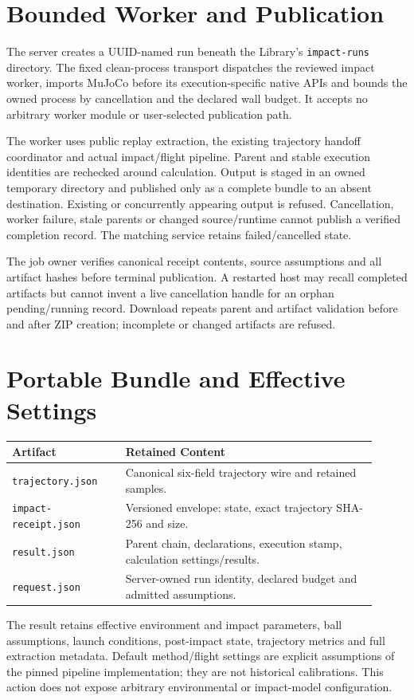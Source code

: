 \documentclass[11pt]{article}
\newcommand{\code}[1]{\nolinkurl{#1}}
\begin{document}
\newpage
\section*{Bounded Worker and Publication}
The server creates a UUID-named run beneath the Library's \code{impact-runs}
directory. The fixed clean-process transport dispatches the reviewed impact
worker, imports MuJoCo before its execution-specific native APIs and bounds the
owned process by cancellation and the declared wall budget. It accepts no
arbitrary worker module or user-selected publication path.

The worker uses public replay extraction, the existing trajectory handoff
coordinator and actual impact/flight pipeline. Parent and stable execution
identities are rechecked around calculation. Output is staged in an owned
temporary directory and published only as a complete bundle to an absent
destination. Existing or concurrently appearing output is refused. Cancellation,
worker failure, stale parents or changed source/runtime cannot publish a verified
completion record. The matching service retains failed/cancelled state.

The job owner verifies canonical receipt contents, source assumptions and all
artifact hashes before terminal publication. A restarted host may recall
completed artifacts but cannot invent a live cancellation handle for an orphan
pending/running record. Download repeats parent and artifact validation before
and after ZIP creation; incomplete or changed artifacts are refused.

\section*{Portable Bundle and Effective Settings}
\begin{center}\small
\begin{tabular}{>{\raggedright\arraybackslash}p{0.29\linewidth}>{\raggedright\arraybackslash}p{0.62\linewidth}}\toprule
Artifact & Retained Content\\\midrule
\code{trajectory.json} & Canonical six-field trajectory wire and retained samples.\\
\code{impact-receipt.json} & Versioned envelope: state, exact trajectory SHA-256 and size.\\
\code{result.json} & Parent chain, declarations, execution stamp, calculation settings/results.\\
\code{request.json} & Server-owned run identity, declared budget and admitted assumptions.\\\bottomrule
\end{tabular}
\end{center}
The result retains effective environment and impact parameters, ball assumptions,
launch conditions, post-impact state, trajectory metrics and full extraction
metadata. Default method/flight settings are explicit assumptions of the pinned
pipeline implementation; they are not historical calibrations. This action does
not expose arbitrary environmental or impact-model configuration.
\end{document}

